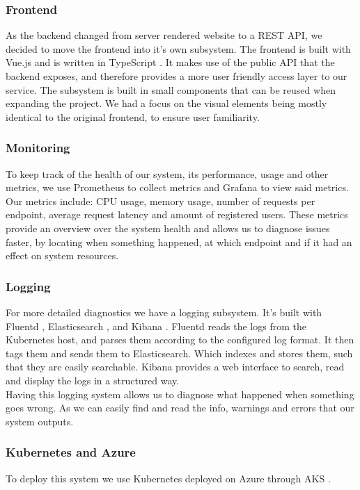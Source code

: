 \subsubsection{Frontend}
As the backend changed from server rendered website to a REST API, we decided to move the frontend into it's own subsystem.
The frontend is built with Vue.js \cite{tool:vue} and is written in TypeScript \cite{tool:typescript}.
It makes use of the public API that the backend exposes, and therefore provides a more user friendly access layer to our service.
The subsystem is built in small components that can be reused when expanding the project. We had a focus on the visual elements being mostly identical to the original frontend, to ensure user familiarity.

\subsubsection{Monitoring}
To keep track of the health of our system, its performance, usage and other metrics, we use Prometheus \cite{tool:prometheus} to collect metrics and Grafana \cite{tool:grafana} to view said metrics.
Our metrics include: CPU usage, memory usage, number of requests per endpoint, average request latency and amount of registered users.
These metrics provide an overview over the system health and allows us to diagnose issues faster, by locating when something happened, at which endpoint and if it had an effect on system resources.

\subsubsection{Logging}
For more detailed diagnostics we have a logging subsystem. It's built with Fluentd \cite{tool:fluentd}, Elasticsearch \cite{tool:elasticsearch}, and Kibana \cite{tool:kibana}.
Fluentd reads the logs from the Kubernetes host, and parses them according to the configured log format.
It then tags them and sends them to Elasticsearch. Which indexes and stores them, such that they are easily searchable.
Kibana provides a web interface to search, read and display the logs in a structured way.\\

Having this logging system allows us to diagnose what happened when something goes wrong.
As we can easily find and read the info, warnings and errors that our system outputs.

\subsubsection{Kubernetes and Azure}
To deploy this system we use Kubernetes \cite{tool:kubernetes} deployed on Azure \cite{tool:azure} through AKS \cite{tool:aks}.

